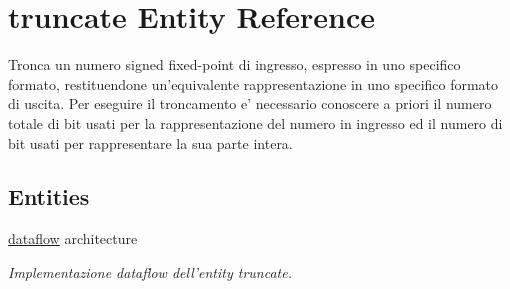 \hypertarget{classtruncate}{\section{truncate Entity Reference}
\label{classtruncate}
}


Tronca un numero signed fixed-\/point di ingresso, espresso in uno specifico formato, restituendone un'equivalente rappresentazione in uno specifico formato di uscita. Per eseguire il troncamento e' necessario conoscere a priori il numero totale di bit usati per la rappresentazione del numero in ingresso ed il numero di bit usati per rappresentare la sua parte intera.  


\subsection*{Entities}
\begin{DoxyCompactItemize}
\item 
\hyperlink{classtruncate_1_1dataflow}{dataflow} architecture
\begin{DoxyCompactList}\small\item\em Implementazione dataflow dell'entity truncate. \end{DoxyCompactList}\end{DoxyCompactItemize}

